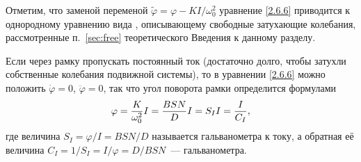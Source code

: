 Отметим, что заменой переменой $\tilde{\varphi} = \varphi - KI/\omega^2_0$ 
уравнение \eqref{2.6.6} приводится к однородному уравнению вида , 
описывающему свободные затухающие колебания, 
рассмотренные п.~\ref{sec:free} теоретического Введения к 
данному разделу.

Если через рамку пропускать постоянный ток (достаточно долго, чтобы затухли 
собственные колебания подвижной системы), то в уравнении \eqref{2.6.6} можно положить 
$\dot{\varphi} = 0$, $\ddot{\varphi} = 0$, так что угол поворота рамки 
определится формулами
\begin{equation}
	\eqmark{2.6.8}
	\varphi = \frac{K}{\omega^2_0}I = \frac{BSN}{D}I = S_I I = \frac{I}{C_I},
\end{equation}
где величина $S_I = \varphi/I = BSN/D$ называется 
 гальванометра к току, а
обратная её величина $C_I = 1/S_I = I/\varphi = D/BSN$~--- 
 гальванометра.

